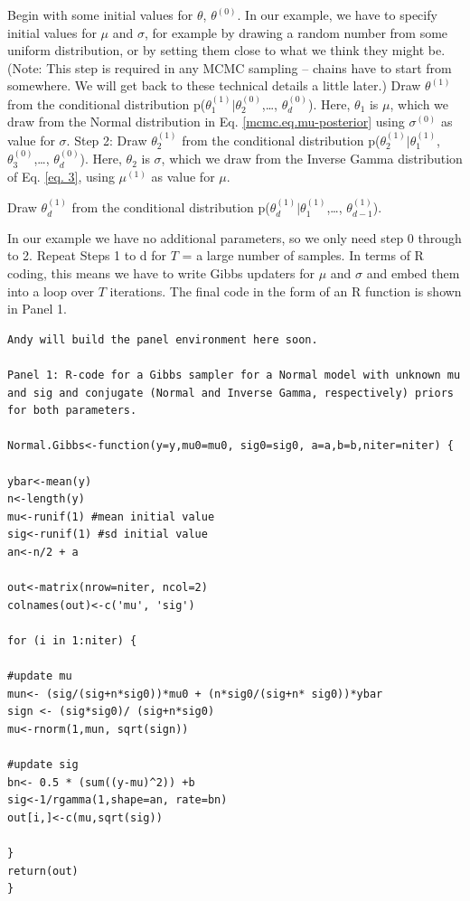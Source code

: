 { Begin with some initial values for $\theta$, $\theta^{(0)}$.   }
In our example, we have to specify initial values for $\mu$ and $\sigma$, for
example by drawing a random number from some uniform distribution, or
by setting them close to what we think they might be. (Note: This step
is required in any MCMC sampling – chains have to start from
somewhere. We will get back to these technical details a little
later.)
{ Draw $\theta^{(1)}$ from the conditional distribution p($\theta_{1}^{(1)}|\theta_{2}^{(0)}$,\ldots, $\theta_{d}^{(0)}$). }
Here, $\theta_1$ is $\mu$, which we draw from the Normal distribution in Eq. \ref{mcmc.eq.mu-posterior}  using $\sigma^{(0)}$ as value for $\sigma$.
{\flushleft Step 2: Draw $\theta_{2}^{(1)}$ from the conditional distribution p($\theta_{2}^{(1)}|\theta_{1}^{(1)}$, $\theta_{3}^{(0)}$,\ldots, $\theta_{d}^{(0)}$). }
Here, $\theta_2$ is $\sigma$, which we draw from the Inverse Gamma
distribution of Eq. \ref{eq. 3}, using $\mu^{(1)}$ as value for $\mu$.

{ Draw $\theta_{d}^{(1)}$ from the conditional distribution p($\theta_{d}^{(1)}|\theta_{1}^{(1)}$,\ldots, $\theta_{d-1}^{(1)}$). }

In our example we have no additional parameters, so we only need step 0 through to 2.
Repeat Steps 1 to d for $T$ = a large number of samples.
In terms of R coding, this means we have to write Gibbs updaters for
$\mu$ and $\sigma$ and embed them into a loop over $T$ iterations. The final
code in the form of an R function is shown in Panel 1.

\begin{verbatim}
Andy will build the panel environment here soon.

Panel 1: R-code for a Gibbs sampler for a Normal model with unknown mu
and sig and conjugate (Normal and Inverse Gamma, respectively) priors
for both parameters.

Normal.Gibbs<-function(y=y,mu0=mu0, sig0=sig0, a=a,b=b,niter=niter) {

ybar<-mean(y)
n<-length(y)
mu<-runif(1) #mean initial value
sig<-runif(1) #sd initial value
an<-n/2 + a

out<-matrix(nrow=niter, ncol=2)
colnames(out)<-c('mu', 'sig')

for (i in 1:niter) {

#update mu
mun<- (sig/(sig+n*sig0))*mu0 + (n*sig0/(sig+n* sig0))*ybar
sign <- (sig*sig0)/ (sig+n*sig0)
mu<-rnorm(1,mun, sqrt(sign))

#update sig
bn<- 0.5 * (sum((y-mu)^2)) +b
sig<-1/rgamma(1,shape=an, rate=bn)
out[i,]<-c(mu,sqrt(sig))

}
return(out)
}
\end{verbatim}

